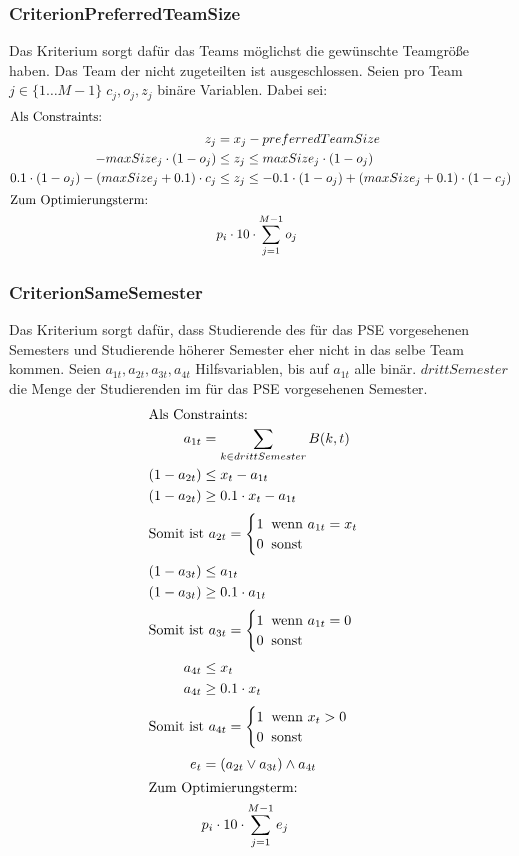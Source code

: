 \documentclass[parskip=full]{scrartcl}
\begin{document}
\subsubsection{CriterionPreferredTeamSize}
Das Kriterium sorgt dafür das Teams möglichst die gewünschte Teamgröße haben.
Das Team der nicht zugeteilten ist ausgeschlossen. Seien pro Team $j \in \{1\ldots M-1 \} \; c_j,o_j,z_j$ binäre Variablen.
Dabei sei: 
\begin{align*}
\intertext{Als Constraints: }
z_j &=x_j - preferredTeamSize\\
-maxSize_j \cdot (1-o_j) &\le z_j \le maxSize_j \cdot (1-o_j)\\
0.1\cdot(1-o_j) - (maxSize_j + 0.1)\cdot c_j &\le z_j \le -0.1\cdot
(1-o_j)+(maxSize_j +0.1)\cdot(1-c_j)\\
\intertext{Zum Optimierungsterm:} 
 &p_i \cdot 10 \cdot \sum_{j = 1}^{M-1}
o_j
\end{align*}
\subsubsection{CriterionSameSemester}
Das Kriterium sorgt dafür, dass Studierende des für das PSE vorgesehenen
Semesters und Studierende höherer Semester eher nicht in das selbe Team kommen. 
Seien $a_{1t},a_{2t},a_{3t},a_{4t}$ Hilfsvariablen, bis auf $a_{1t}$ alle binär.
$drittSemester$ die Menge der Studierenden im für das PSE vorgesehenen Semester.
\begin{align*}
\intertext{Als Constraints:} 
a_{1t} &= \sum_{k \in drittSemester} B(k,t) \\
(1 - a_{2t}) &\le x_t - a_{1t} \\ (1 - a_{2t}) &\ge 0.1 \cdot x_t - a_{1t} \\
\intertext{$\text{Somit ist } a_{2t} = \begin{cases}
    1 \;\; \text{wenn $a_{1t} = x_t$} \\
    0 \;\; \text{sonst} 
\end{cases}$}
(1-a_{3t}) &\le a_{1t} \\
(1-a_{3t}) &\ge 0.1 \cdot a_{1t}\\
\intertext{$\text{Somit ist } a_{3t} = \begin{cases}
    1 \;\; \text{wenn $a_{1t} = 0$} \\
    0 \;\; \text{sonst} 
\end{cases}$}
a_{4t} &\le x_t \\
a_{4t} &\ge 0.1 \cdot x_t \\
\intertext{$\text{Somit ist } a_{4t} = \begin{cases}
    1 \;\; \text{wenn $x_t > 0$} \\
    0 \;\; \text{sonst} 
\end{cases}$}
e_t &= (a_{2t} \vee a_{3t}) \wedge a_{4t}\\ \intertext{Zum Optimierungsterm:} 
&p_i \cdot 10 \cdot \sum_{j=1 }^{M-1} e_j
\end{align*}
\end{document}
